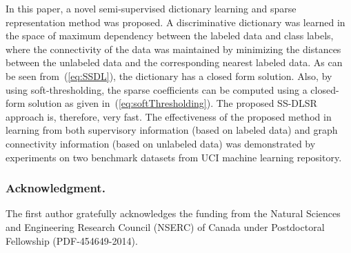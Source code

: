 \documentclass{llncs}
\begin{document}
In this paper, a novel semi-supervised dictionary learning and sparse representation method was proposed. A discriminative dictionary was learned in the space of maximum dependency between the labeled data and class labels, where the connectivity of the data was maintained by minimizing the distances between the unlabeled data and the corresponding nearest labeled data. As can be seen from~(\ref{eq:SSDL}), the dictionary has a closed form solution. Also, by using soft-thresholding, the sparse coefficients can be computed using a closed-form solution as given in~(\ref{eq:softThresholding}). The proposed SS-DLSR approach is, therefore, very fast. The effectiveness of the proposed method in learning from both supervisory information (based on labeled data) and graph connectivity information (based on unlabeled data) was demonstrated by experiments on two benchmark datasets from UCI machine learning repository.

\subsubsection{Acknowledgment.}

The first author gratefully acknowledges the funding from the Natural Sciences and Engineering Research Council (NSERC) of Canada under Postdoctoral Fellowship (PDF-454649-2014).

%
%



\end{document}
